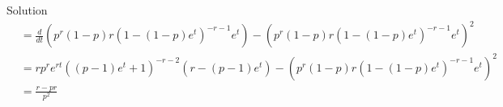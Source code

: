 \documentclass{article}
\begin{document}
\begin{spacing}{1.1}
\begin{homeworkProblem}
\begin{homeworkSection}{Solution}
\begin{align*}
      &= \frac{ d}{ dt} (p^r(1 - p) r ( 1- (1 - p) e^t)^{-r - 1} e^t) - \left(p^r(1 - p) r ( 1- (1 - p) e^t)^{-r - 1} e^t\right)^2\\
      &=  r p^r e^{r t} ((p-1) e^t+1)^{-r-2} (r-(p-1) e^t) - \left(p^r(1 - p) r ( 1- (1 - p) e^t)^{-r - 1} e^t\right)^2\\
      &= \frac{ r - pr}{ p^2}\\
    \end{align*}
  \end{homeworkSection}
\end{homeworkProblem}
  
\end{spacing}
\end{document}

